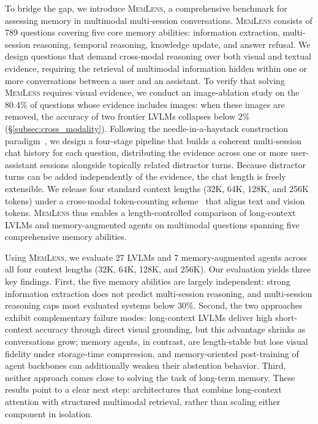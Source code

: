 \documentclass{llmxive}
\providecommand{\bench}{\textsc{MemLens}}
\begin{document}
To bridge the gap, we introduce \bench{}, a comprehensive benchmark for assessing memory in multimodal multi-session conversations. \bench{} consists of 789 questions covering five core memory abilities: information extraction, multi-session reasoning, temporal reasoning, knowledge update, and answer refusal. We design questions that demand cross-modal reasoning over both visual and textual evidence, requiring the retrieval of multimodal information hidden within one or more conversations between a user and an assistant. To verify that solving \bench{} requires visual evidence, we conduct an image-ablation study on the 80.4\% of questions whose evidence includes images: when these images are removed, the accuracy of two frontier LVLMs collapses below 2\% (\S\ref{subsec:cross_modality}). Following the needle-in-a-haystack construction paradigm~\cite{kamradt2023needle}, we design a four-stage pipeline that builds a coherent multi-session chat history for each question, distributing the evidence across one or more user-assistant sessions alongside topically related distractor turns. Because distractor turns can be added independently of the evidence, the chat length is freely extensible. We release four standard context lengths (32K, 64K, 128K, and 256K tokens) under a cross-modal token-counting scheme~\cite{mmlongbench} that aligns text and vision tokens. \bench{} thus enables a length-controlled comparison of long-context LVLMs and memory-augmented agents on multimodal questions spanning five comprehensive memory abilities.


Using \bench{}, we evaluate 27 LVLMs and 7 memory-augmented agents across all four context lengths (32K, 64K, 128K, and 256K). Our evaluation yields three key findings. First, the five memory abilities are largely independent: strong information extraction does not predict multi-session reasoning, and multi-session reasoning caps most evaluated systems below 30\%. Second, the two approaches exhibit complementary failure modes: long-context LVLMs deliver high short-context accuracy through direct visual grounding, but this advantage shrinks as conversations grow; memory agents, in contrast, are length-stable but lose visual fidelity under storage-time compression, and memory-oriented post-training of agent backbones can additionally weaken their abstention behavior. Third, neither approach comes close to solving the task of long-term memory. These results point to a clear next step: architectures that combine long-context attention with structured multimodal retrieval, rather than scaling either component in isolation.
\end{document}

